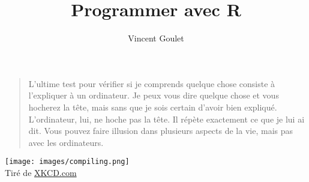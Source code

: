 \documentclass[letterpaper,11pt,x11names,english,french]{memoir}
\title{Programmer avec R}
\author{Vincent Goulet}
\theoremstyle{definition}
\newcounter{videos}[chapter]
\begin{document}
\frontmatter

\pagestyle{empty}


\null\cleartoverso              %


\clearpage

\pagestyle{companion}



\tableofcontents
\cleartorecto
\listoftables
\cleartorecto
\listoffigures
\cleartorecto
\listofvideos



\cleartorecto
\thispagestyle{empty}
\begin{vplace}[0.45]
  \begin{quote}
    L'ultime test pour vérifier si je comprends quelque chose
    consiste à l'expliquer à un ordinateur. Je peux vous dire quelque
    chose et vous hocherez la tête, mais sans que je sois certain d'avoir
    bien expliqué. L'ordinateur, lui, ne hoche pas la tête. Il répète
    exactement ce que je lui ai dit. Vous pouvez faire illusion dans
    plusieurs aspects de la vie, mais pas avec les ordinateurs.
  \end{quote}
\end{vplace}

\cleartoverso
\thispagestyle{empty}
\begin{vplace}[0.45]
  \centering
  \begin{minipage}{0.9\linewidth}
    \texttt{[image: images/compiling.png]} \\
    \footnotesize\sffamily%
    Tiré de \href{https://xkcd.com/303/}{XKCD.com}
  \end{minipage}
\end{vplace}

\mainmatter














\appendix






\cleardoublepage
\printindex

\pagestyle{empty}

\cleartoverso


\cleartoverso

\end{document}

